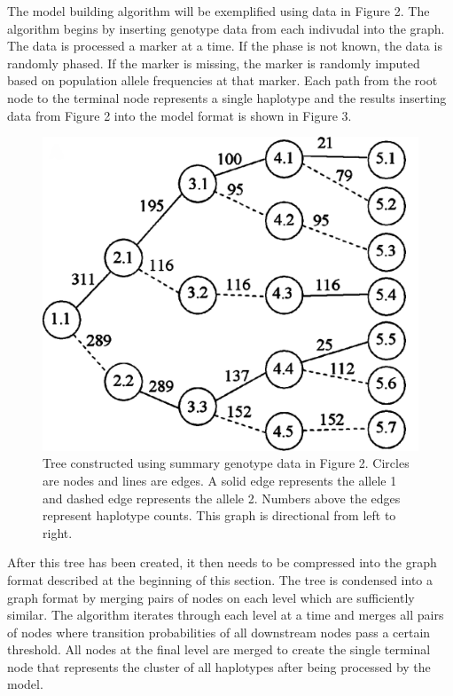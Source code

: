 \documentclass[a4paper,11pt,twoside,abstraction,titlepage]{article}
\begin{document}
\noindent The model building algorithm will be exemplified using data in Figure 2.   The algorithm begins by inserting genotype data from each indivudal into the graph.  The data is processed a marker at a time.  If the phase is not known, the data is randomly phased.  If the marker is missing, the marker is randomly imputed based on population allele frequencies at that marker.  Each path from the root node to the terminal node represents a single haplotype and the results inserting data from Figure 2 into the model format is shown in Figure 3.

\begin{figure}[htp!]
\vspace{10pt}
\begin{center}
\centerline{\includegraphics[scale=0.08]{fig3}}
\vspace{2pt}
\caption{Tree constructed using summary genotype data in Figure 2. Circles are nodes and lines are edges. A solid edge represents the allele 1 and dashed edge represents the allele 2. Numbers above the edges represent haplotype counts.  This graph is directional from left to right. \cite{beagle1}}

\end{center}
\vspace{-25pt}
\end{figure}


After this tree has been created, it then needs to be compressed into the graph format described at the beginning of this section.  The tree is condensed into a graph format by merging pairs of nodes on each level which are sufficiently similar.  The algorithm iterates through each level at a time and merges all pairs of nodes where transition probabilities of all downstream nodes pass a certain threshold.  All nodes at the final level are merged to create the single terminal node that represents the cluster of all haplotypes after being processed by the model.
\end{document}
